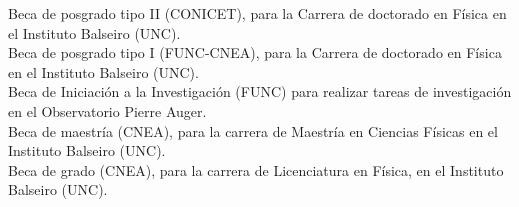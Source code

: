 Beca de posgrado tipo II (CONICET), para la Carrera de doctorado en Física en el Instituto Balseiro (UNC).\\
Beca de posgrado tipo I (FUNC-CNEA), para la Carrera de doctorado en Física en el Instituto Balseiro (UNC).\\
Beca de Iniciación a la Investigación (FUNC) para realizar tareas de investigación en el Observatorio Pierre Auger.\\
Beca de maestría (CNEA), para la carrera de Maestría en Ciencias Físicas en el Instituto Balseiro (UNC).\\
Beca de grado (CNEA), para la carrera de Licenciatura en Física, en el Instituto Balseiro (UNC).
\fi
